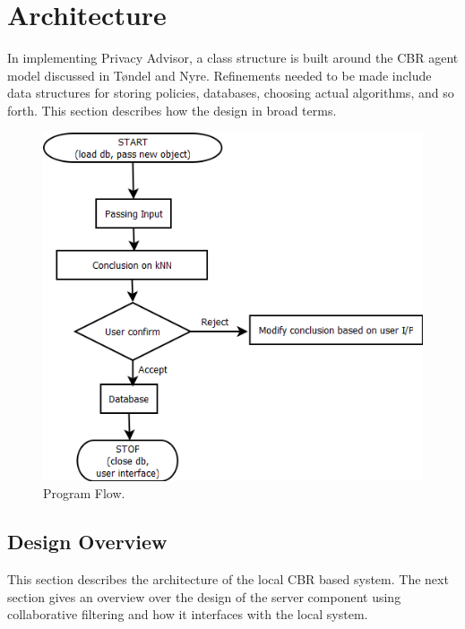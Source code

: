 \section{Architecture}
In implementing Privacy Advisor, a class structure is built around the CBR agent model discussed in T{\o}ndel and Nyre. Refinements needed to be made include data structures for storing policies, databases, choosing actual algorithms, and so forth. This section describes how the design in broad terms.

\begin{figure}[htbp]
\begin{center}
\includegraphics[width = \textwidth]{DesignReport/uml/flowchart.png}
\caption{Program Flow.}
\label{DesignFlowChrt}
\end{center}
\end{figure}

\subsection{Design Overview}
This section describes the architecture of the local CBR based system. The next section gives an overview over the design of the server component using collaborative filtering and how it interfaces with the local system.  

